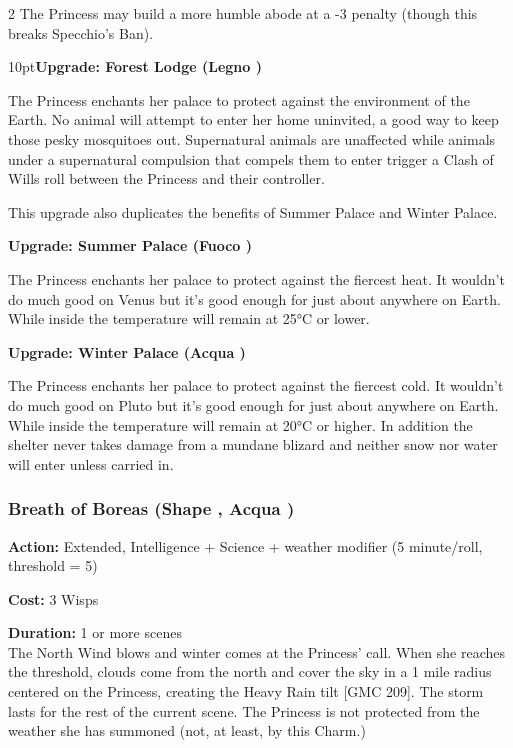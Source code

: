\begin{multicols}{2}
The Princess may build a more humble abode at a -3 penalty (though this breaks Specchio's Ban).

\begin{myindentpar}{10pt}\textbf{Upgrade: Forest Lodge (Legno \textbullet)}

The Princess enchants her palace to protect against the environment of the Earth. No animal will attempt to enter her home uninvited, a good way to keep those pesky mosquitoes out. Supernatural animals are unaffected while animals under a supernatural compulsion that compels them to enter trigger a Clash of Wills roll between the Princess and their controller. 

This upgrade also duplicates the benefits of Summer Palace and Winter Palace.

\textbf{Upgrade: Summer Palace (Fuoco \textbullet\textbullet)}

The Princess enchants her palace to protect against the fiercest heat. It wouldn't do much good on Venus but it's good enough for just about anywhere on Earth. While inside the temperature will remain at 25°C or lower.

\textbf{Upgrade: Winter Palace (Acqua \textbullet\textbullet)}

The Princess enchants her palace to protect against the fiercest cold. It wouldn't do much good on Pluto but it's good enough for just about anywhere on Earth. While inside the temperature will remain at 20°C or higher. In addition the shelter never takes damage from a mundane blizard and neither snow nor water will enter unless carried in.

\end{myindentpar}

\subsubsection*{Breath of Boreas (Shape \textbullet\textbullet\textbullet\textbullet, Acqua \textbullet\textbullet\textbullet)}

\noindent \textbf{Action:} Extended, Intelligence + Science + weather modifier (5 minute/roll, threshold = 5)

\noindent \textbf{Cost:} 3 Wisps

\noindent \textbf{Duration:} 1 or more scenes\\

\noindent The North Wind blows and winter comes at the Princess' call. When she reaches the threshold, clouds come from the north and cover the sky in a 1 mile radius centered on the Princess, creating the Heavy Rain tilt [GMC 209]. The storm lasts for the rest of the current scene. The Princess is not protected from the weather she has summoned (not, at least, by this Charm.)


\end{multicols}
